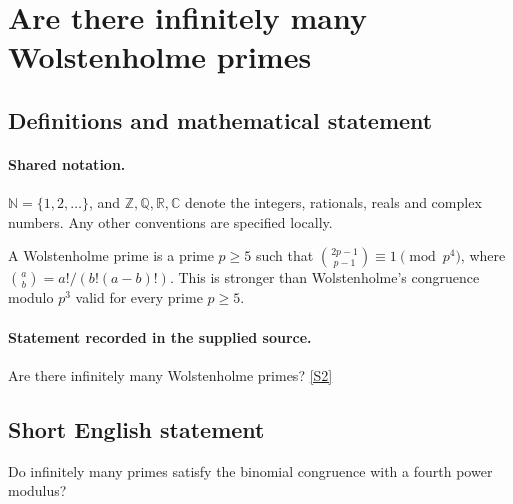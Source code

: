 \documentclass[11pt]{article}
\newcommand{\sref}[2]{\hyperlink{source:#1:#2}{[S#2]}}
\begin{document}
\section{Are there infinitely many Wolstenholme primes}\label{statement}

\subsection{Definitions and mathematical statement}

\paragraph{Shared notation.}$\mathbb N=\{1,2,\ldots\}$, and $\mathbb Z,\mathbb Q,\mathbb R,\mathbb C$ denote the integers, rationals, reals and complex numbers. Any other conventions are specified locally.


A Wolstenholme prime is a prime $p\ge5$ such that $\binom{2p-1}{p-1}\equiv1\pmod{p^4}$, where $\binom ab=a!/(b!(a-b)!)$. This is stronger than Wolstenholme's congruence modulo $p^3$ valid for every prime $p\ge5$.
\paragraph{Statement recorded in the supplied source.}
Are there infinitely many Wolstenholme primes? \sref{statement}{2}
\subsection{Short English statement}
Do infinitely many primes satisfy the binomial congruence with a fourth power modulus?
\end{document}
